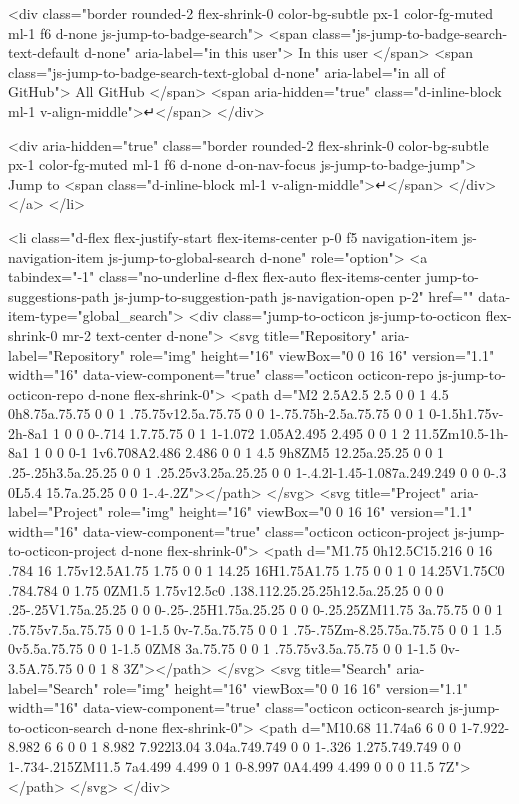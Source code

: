     <div class="border rounded-2 flex-shrink-0 color-bg-subtle px-1 color-fg-muted ml-1 f6 d-none js-jump-to-badge-search">
      <span class="js-jump-to-badge-search-text-default d-none" aria-label="in this user">
        In this user
      </span>
      <span class="js-jump-to-badge-search-text-global d-none" aria-label="in all of GitHub">
        All GitHub
      </span>
      <span aria-hidden="true" class="d-inline-block ml-1 v-align-middle">↵</span>
    </div>

    <div aria-hidden="true" class="border rounded-2 flex-shrink-0 color-bg-subtle px-1 color-fg-muted ml-1 f6 d-none d-on-nav-focus js-jump-to-badge-jump">
      Jump to
      <span class="d-inline-block ml-1 v-align-middle">↵</span>
    </div>
  </a>
</li>

  

<li class="d-flex flex-justify-start flex-items-center p-0 f5 navigation-item js-navigation-item js-jump-to-global-search d-none" role="option">
  <a tabindex="-1" class="no-underline d-flex flex-auto flex-items-center jump-to-suggestions-path js-jump-to-suggestion-path js-navigation-open p-2" href="" data-item-type="global_search">
    <div class="jump-to-octicon js-jump-to-octicon flex-shrink-0 mr-2 text-center d-none">
      <svg title="Repository" aria-label="Repository" role="img" height="16" viewBox="0 0 16 16" version="1.1" width="16" data-view-component="true" class="octicon octicon-repo js-jump-to-octicon-repo d-none flex-shrink-0">
    <path d="M2 2.5A2.5 2.5 0 0 1 4.5 0h8.75a.75.75 0 0 1 .75.75v12.5a.75.75 0 0 1-.75.75h-2.5a.75.75 0 0 1 0-1.5h1.75v-2h-8a1 1 0 0 0-.714 1.7.75.75 0 1 1-1.072 1.05A2.495 2.495 0 0 1 2 11.5Zm10.5-1h-8a1 1 0 0 0-1 1v6.708A2.486 2.486 0 0 1 4.5 9h8ZM5 12.25a.25.25 0 0 1 .25-.25h3.5a.25.25 0 0 1 .25.25v3.25a.25.25 0 0 1-.4.2l-1.45-1.087a.249.249 0 0 0-.3 0L5.4 15.7a.25.25 0 0 1-.4-.2Z"></path>
</svg>
      <svg title="Project" aria-label="Project" role="img" height="16" viewBox="0 0 16 16" version="1.1" width="16" data-view-component="true" class="octicon octicon-project js-jump-to-octicon-project d-none flex-shrink-0">
    <path d="M1.75 0h12.5C15.216 0 16 .784 16 1.75v12.5A1.75 1.75 0 0 1 14.25 16H1.75A1.75 1.75 0 0 1 0 14.25V1.75C0 .784.784 0 1.75 0ZM1.5 1.75v12.5c0 .138.112.25.25.25h12.5a.25.25 0 0 0 .25-.25V1.75a.25.25 0 0 0-.25-.25H1.75a.25.25 0 0 0-.25.25ZM11.75 3a.75.75 0 0 1 .75.75v7.5a.75.75 0 0 1-1.5 0v-7.5a.75.75 0 0 1 .75-.75Zm-8.25.75a.75.75 0 0 1 1.5 0v5.5a.75.75 0 0 1-1.5 0ZM8 3a.75.75 0 0 1 .75.75v3.5a.75.75 0 0 1-1.5 0v-3.5A.75.75 0 0 1 8 3Z"></path>
</svg>
      <svg title="Search" aria-label="Search" role="img" height="16" viewBox="0 0 16 16" version="1.1" width="16" data-view-component="true" class="octicon octicon-search js-jump-to-octicon-search d-none flex-shrink-0">
    <path d="M10.68 11.74a6 6 0 0 1-7.922-8.982 6 6 0 0 1 8.982 7.922l3.04 3.04a.749.749 0 0 1-.326 1.275.749.749 0 0 1-.734-.215ZM11.5 7a4.499 4.499 0 1 0-8.997 0A4.499 4.499 0 0 0 11.5 7Z"></path>
</svg>
    </div>

